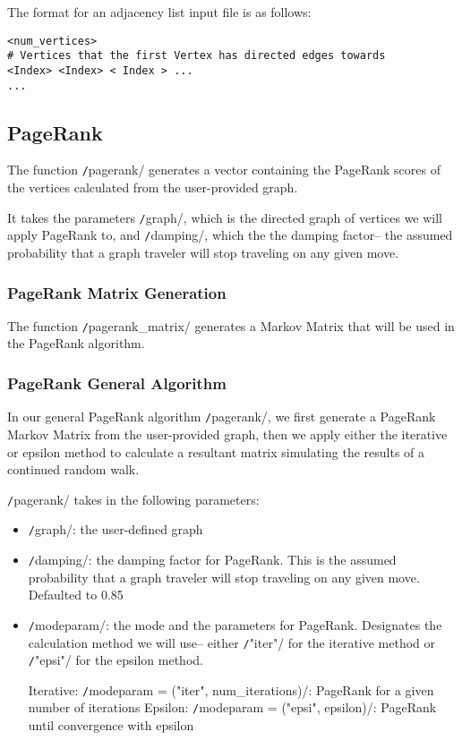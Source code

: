 \documentclass[12pt, titlepage, twoside]{amsart}
\theoremstyle{remark}
\begin{document}
The format for an adjacency list input file is as follows:

\begin{lstlisting}[basicstyle=\small]
<num_vertices>
# Vertices that the first Vertex has directed edges towards
<Index> <Index> < Index > ...
...
\end{lstlisting}

\subsection{PageRank}

The function \texttt/pagerank/ generates a vector containing the PageRank scores of the
vertices calculated from the user-provided graph.

It takes the parameters \texttt/graph/,
which is the directed graph of vertices we will apply PageRank to,
and \texttt/damping/, which the the damping factor-- the assumed probability that a graph traveler will stop traveling on any given move.

\subsubsection{PageRank Matrix Generation}

The function \texttt/pagerank_matrix/ generates a Markov Matrix that will be used in the PageRank algorithm.

\subsubsection{PageRank General Algorithm}

In our general PageRank algorithm \texttt/pagerank/,
we first generate a PageRank Markov Matrix from the user-provided graph,
then we apply either the iterative or epsilon method to calculate a resultant matrix simulating the results of a continued random walk.

\texttt/pagerank/ takes in the following parameters:

\begin{itemize}[label={}]
\item \texttt/graph/: the user-defined graph

\item \texttt/damping/: the damping factor for PageRank. 
This is the assumed probability that a graph traveler will stop traveling on any given move. Defaulted to 0.85

\item \texttt/modeparam/: the mode and the parameters for PageRank.
Designates the calculation method we will use-- either \texttt/"iter"/ for the iterative method or \texttt/"epsi"/ for the epsilon method.

Iterative: \texttt/modeparam = ("iter", num_iterations)/:
PageRank for a given number of iterations
Epsilon: \texttt/modeparam = ("epsi", epsilon)/: PageRank until convergence with epsilon
\end{itemize}
\end{document}
